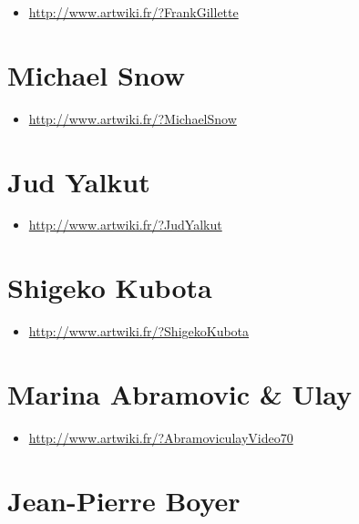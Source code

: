 \documentclass[
  french,
]{book}
\providecommand{\tightlist}{%
  \setlength{\itemsep}{0pt}\setlength{\parskip}{0pt}}
\begin{document}
\begin{itemize}
\tightlist
\item
  \url{http://www.artwiki.fr/?FrankGillette}
\end{itemize}

\hypertarget{michael-snow}{%
\section{Michael Snow}\label{michael-snow}}

\begin{itemize}
\tightlist
\item
  \url{http://www.artwiki.fr/?MichaelSnow}
\end{itemize}

\hypertarget{jud-yalkut}{%
\section{Jud Yalkut}\label{jud-yalkut}}

\begin{itemize}
\tightlist
\item
  \url{http://www.artwiki.fr/?JudYalkut}
\end{itemize}

\hypertarget{shigeko-kubota}{%
\section{Shigeko Kubota}\label{shigeko-kubota}}

\begin{itemize}
\tightlist
\item
  \url{http://www.artwiki.fr/?ShigekoKubota}
\end{itemize}

\hypertarget{marina-abramovic-ulay}{%
\section{Marina Abramovic \& Ulay}\label{marina-abramovic-ulay}}

\begin{itemize}
\tightlist
\item
  \url{http://www.artwiki.fr/?AbramoviculayVideo70}
\end{itemize}

\hypertarget{jean-pierre-boyer}{%
\section{Jean-Pierre Boyer}\label{jean-pierre-boyer}}
\end{document}
